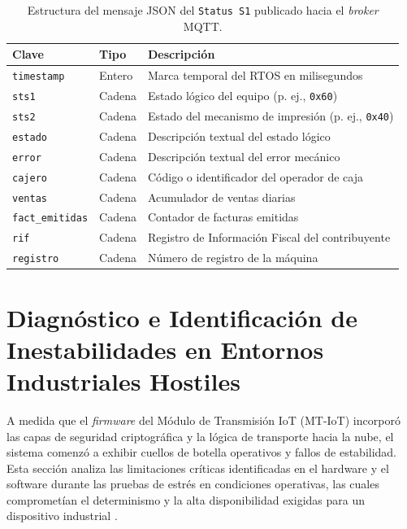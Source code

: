 \begin{table}[htbp]
\centering
\caption{Estructura del mensaje JSON del \texttt{Status S1} publicado hacia el \textit{broker} MQTT.}
\label{tab:json_s1}
\begin{tabularx}{\textwidth}{@{}l l >{\raggedright\arraybackslash}X@{}}
\toprule
\textbf{Clave} & \textbf{Tipo} & \textbf{Descripción} \\
\midrule
\texttt{timestamp} & Entero & Marca temporal del RTOS en milisegundos \\
\texttt{sts1} & Cadena & Estado lógico del equipo (p. ej., \texttt{0x60}) \\
\texttt{sts2} & Cadena & Estado del mecanismo de impresión (p. ej., \texttt{0x40}) \\
\texttt{estado} & Cadena & Descripción textual del estado lógico \\
\texttt{error} & Cadena & Descripción textual del error mecánico \\
\texttt{cajero} & Cadena & Código o identificador del operador de caja \\
\texttt{ventas} & Cadena & Acumulador de ventas diarias \\
\texttt{fact\_emitidas} & Cadena & Contador de facturas emitidas \\
\texttt{rif} & Cadena & Registro de Información Fiscal del contribuyente \\
\texttt{registro} & Cadena & Número de registro de la máquina \\
\bottomrule
\end{tabularx}
\end{table}

\section{Diagnóstico e Identificación de Inestabilidades en Entornos Industriales Hostiles}

\par A medida que el \textit{firmware} del Módulo de Transmisión IoT (MT-IoT) incorporó las capas de seguridad criptográfica y la lógica de transporte hacia la nube, el sistema comenzó a exhibir cuellos de botella operativos y fallos de estabilidad. Esta sección analiza las limitaciones críticas identificadas en el hardware y el software durante las pruebas de estrés en condiciones operativas, las cuales comprometían el determinismo y la alta disponibilidad exigidas para un dispositivo industrial \cite{Connected_Everything_2016}.

